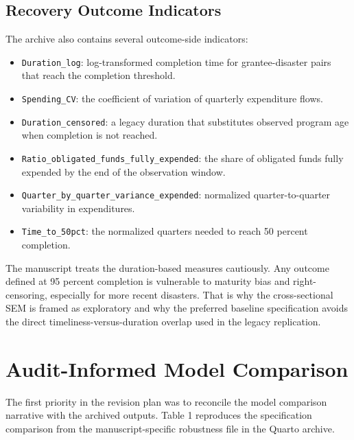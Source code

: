 \documentclass[
  letterpaper,
]{article}
\providecommand{\tightlist}{%
  \setlength{\itemsep}{0pt}\setlength{\parskip}{0pt}}
\begin{document}
\subsection{Recovery Outcome
Indicators}\label{recovery-outcome-indicators}

The archive also contains several outcome-side indicators:

\begin{itemize}
\tightlist
\item
  \texttt{Duration\_log}: log-transformed completion time for
  grantee-disaster pairs that reach the completion threshold.
\item
  \texttt{Spending\_CV}: the coefficient of variation of quarterly
  expenditure flows.
\item
  \texttt{Duration\_censored}: a legacy duration that substitutes
  observed program age when completion is not reached.
\item
  \texttt{Ratio\_obligated\_funds\_fully\_expended}: the share of
  obligated funds fully expended by the end of the observation window.
\item
  \texttt{Quarter\_by\_quarter\_variance\_expended}: normalized
  quarter-to-quarter variability in expenditures.
\item
  \texttt{Time\_to\_50pct}: the normalized quarters needed to reach 50
  percent completion.
\end{itemize}

The manuscript treats the duration-based measures cautiously. Any
outcome defined at 95 percent completion is vulnerable to maturity bias
and right-censoring, especially for more recent disasters. That is why
the cross-sectional SEM is framed as exploratory and why the preferred
baseline specification avoids the direct timeliness-versus-duration
overlap used in the legacy replication.

\section{Audit-Informed Model
Comparison}\label{audit-informed-model-comparison}

The first priority in the revision plan was to reconcile the model
comparison narrative with the archived outputs. Table 1 reproduces the
specification comparison from the manuscript-specific robustness file in
the Quarto archive.
\end{document}
